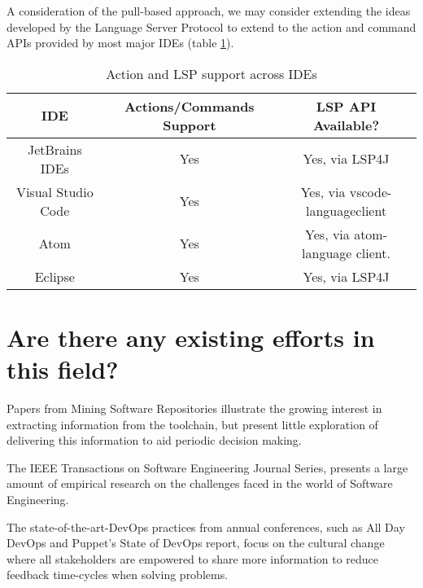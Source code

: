 A consideration of the pull-based approach, we may consider extending the ideas developed by the Language Server Protocol to extend to the action and command APIs provided by most major IDEs (table \ref{table:1}).

\begin{table}
\centering
\begin{tabular}{ | c | c | c |}
	\hline
		IDE & Actions/Commands Support & LSP API Available?\\
	\hline
	\hline
		JetBrains IDEs & Yes & Yes, via LSP4J\\ 
		Visual Studio Code & Yes & Yes, via vscode-languageclient \\
		Atom & Yes & Yes, via atom-language client.\\
		Eclipse & Yes & Yes, via LSP4J\\
	\hline
\end{tabular}
\caption{Action and LSP support across IDEs}
\label{table:1}
\end{table}


\section{Are there any existing efforts in this field?}

Papers from Mining Software Repositories illustrate the growing interest in extracting information from the toolchain, but present little exploration of delivering this information to aid periodic decision making. 


The IEEE Transactions on Software Engineering Journal Series, presents a large amount of empirical research on the challenges faced in the world of Software Engineering. 


The state-of-the-art-DevOps practices from annual conferences, such as All Day DevOps and Puppet's State of DevOps report, focus on the cultural change where all stakeholders are empowered to share more information to reduce feedback time-cycles when solving problems.

